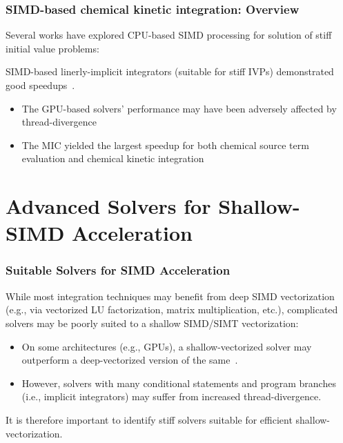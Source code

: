 \documentclass{beamer}
\newcounter{stiff}
\begin{document}
\begin{frame}
\frametitle{SIMD-based chemical kinetic integration: Overview}
Several works have explored CPU-based SIMD processing for solution of stiff initial value problems:
\begin{itemize}
 {
 \item SIMD-based linerly-implicit integrators (suitable for stiff IVPs) demonstrated good speedups~.
 \begin{itemize}
  \item The GPU-based solvers' performance may have been adversely affected by thread-divergence
  \item The MIC yielded the largest speedup for both chemical source term evaluation and chemical kinetic integration
 \end{itemize}
 }
\end{itemize}
\end{frame}


\section{Advanced Solvers for Shallow-SIMD Acceleration}
\begin{frame}
\frametitle{Suitable Solvers for SIMD Acceleration}
 While most integration techniques may benefit from deep SIMD vectorization (e.g., via vectorized LU factorization, matrix multiplication, etc.), complicated solvers may be poorly suited to a shallow SIMD\slash SIMT vectorization:
 \begin{itemize}
  \item On some architectures (e.g., GPUs), a shallow-vectorized solver may outperform a deep-vectorized version of the same~.
  \item However, solvers with many conditional statements and program branches (i.e., implicit integrators) may suffer from increased thread-divergence\footnotemark[\value{footnote}].
 \end{itemize}
 It is therefore important to identify stiff solvers suitable for efficient shallow-vectorization.
\end{frame}
\end{document}
